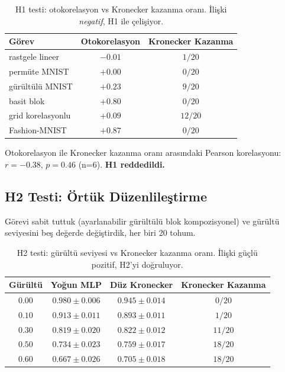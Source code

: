 \documentclass[11pt,a4paper]{article}
\begin{document}
\begin{table}[h]
\centering
\caption{H1 testi: otokorelasyon vs Kronecker kazanma oranı.
İlişki \emph{negatif}, H1 ile çelişiyor.}
\label{tab:h1}
\small
\begin{tabular}{lcc}
\toprule
Görev & Otokorelasyon & Kronecker Kazanma \\
\midrule
rastgele lineer   & $-0.01$ & $1/20$ \\
permüte MNIST     & $+0.00$ & $0/20$ \\
gürültülü MNIST   & $+0.23$ & $9/20$ \\
basit blok        & $+0.80$ & $0/20$ \\
grid korelasyonlu & $+0.09$ & $12/20$ \\
Fashion-MNIST     & $+0.87$ & $0/20$ \\
\bottomrule
\end{tabular}
\end{table}

Otokorelasyon ile Kronecker kazanma oranı arasındaki Pearson
korelasyonu: $r = -0.38$, $p = 0.46$ (n=6). \textbf{H1
reddedildi.}


\subsection{H2 Testi: Örtük Düzenlileştirme}
\label{sec:h2}

Görevi sabit tuttuk (ayarlanabilir gürültülü blok kompozisyonel)
ve gürültü seviyesini beş değerde değiştirdik, her biri 20 tohum.

\begin{table}[h]
\centering
\caption{H2 testi: gürültü seviyesi vs Kronecker kazanma oranı.
İlişki güçlü pozitif, H2'yi doğruluyor.}
\label{tab:h2}
\small
\begin{tabular}{cccc}
\toprule
Gürültü & Yoğun MLP & Düz Kronecker & Kronecker Kazanma \\
\midrule
$0.00$ & $0.980 \pm 0.006$ & $0.945 \pm 0.014$ & $0/20$ \\
$0.10$ & $0.913 \pm 0.011$ & $0.893 \pm 0.011$ & $1/20$ \\
$0.30$ & $0.819 \pm 0.020$ & $0.822 \pm 0.012$ & $11/20$ \\
$0.50$ & $0.734 \pm 0.023$ & $0.759 \pm 0.017$ & $18/20$ \\
$0.60$ & $0.667 \pm 0.026$ & $0.705 \pm 0.018$ & $18/20$ \\
\bottomrule
\end{tabular}
\end{table}
\end{document}
